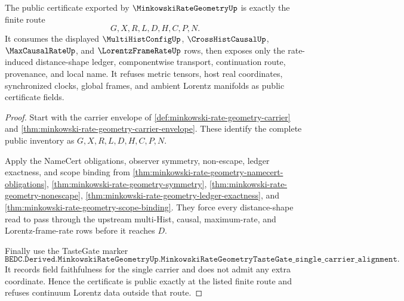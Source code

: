 \begin{theorem}
\label{thm:minkowski-rate-geometry-public-certificate}
The public certificate exported by $\MinkowskiRateGeometryUp$ is exactly the finite route
$$
G,X,R,L,D,H,C,P,N.
$$
It consumes the displayed $\MultiHistConfigUp$, $\CrossHistCausalUp$, $\MaxCausalRateUp$, and $\LorentzFrameRateUp$ rows, then exposes only the rate-induced distance-shape ledger, componentwise transport, continuation route, provenance, and local name. It refuses metric tensors, host real coordinates, synchronized clocks, global frames, and ambient Lorentz manifolds as public certificate fields.
\end{theorem}
\begin{proof}
Start with the carrier envelope of \autoref{def:minkowski-rate-geometry-carrier} and \autoref{thm:minkowski-rate-geometry-carrier-envelope}. These identify the complete public inventory as $G,X,R,L,D,H,C,P,N$.

Apply the NameCert obligations, observer symmetry, non-escape, ledger exactness, and scope binding from \autoref{thm:minkowski-rate-geometry-namecert-obligations}, \autoref{thm:minkowski-rate-geometry-symmetry}, \autoref{thm:minkowski-rate-geometry-nonescape}, \autoref{thm:minkowski-rate-geometry-ledger-exactness}, and \autoref{thm:minkowski-rate-geometry-scope-binding}. They force every distance-shape read to pass through the upstream multi-Hist, causal, maximum-rate, and Lorentz-frame-rate rows before it reaches $D$.

Finally use the TasteGate marker
$$
\texttt{BEDC.Derived.MinkowskiRateGeometryUp.MinkowskiRateGeometryTasteGate\_single\_carrier\_alignment}.
$$
It records field faithfulness for the single carrier and does not admit any extra coordinate. Hence the certificate is public exactly at the listed finite route and refuses continuum Lorentz data outside that route.
\end{proof}


